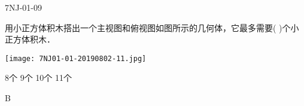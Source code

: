 \begin{defproblem}{7NJ-01-09}%
\begin{onlyproblem}%
用小正方体积木搭出一个主视图和俯视图如图所示的几何体，它最多需要(    )个小正方体积木．
\begin{center}
\texttt{[image: 7NJ01-01-20190802-11.jpg]}
\end{center}

\xx
{8个}
{9个}
{10个}
{11个}


\end{onlyproblem}%
\begin{onlysolution}%
\begin{solution}%
B
\end{solution}%
\end{onlysolution}%
\end{defproblem}






